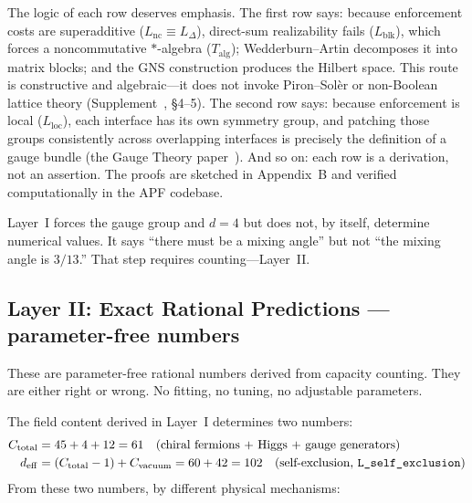 \documentclass[11pt]{article}
\begin{document}
The logic of each row deserves emphasis.  The first row says: because enforcement costs are superadditive ($L_{\mathrm{nc}} \equiv L_\Delta$), direct-sum realizability fails ($L_{\mathrm{blk}}$), which forces a noncommutative $*$-algebra ($T_{\mathrm{alg}}$); Wedderburn--Artin decomposes it into matrix blocks; and the GNS construction produces the Hilbert space.  This route is constructive and algebraic---it does not invoke Piron--Sol\`er or non-Boolean lattice theory (Supplement~\cite{Supp}, §4--5).  The second row says: because enforcement is local ($L_{\mathrm{loc}}$), each interface has its own symmetry group, and patching those groups consistently across overlapping interfaces is precisely the definition of a gauge bundle (the Gauge Theory paper~\cite{PGT}).  And so on: each row is a derivation, not an assertion.  The proofs are sketched in Appendix~B and verified computationally in the APF codebase.

Layer~I forces the gauge group and $d=4$ but does not, by itself, determine numerical values.  It says ``there must be a mixing angle'' but not ``the mixing angle is $3/13$.''  That step requires counting---Layer~II.


\subsection{Layer II: Exact Rational Predictions --- parameter-free numbers}

These are parameter-free rational numbers derived from capacity counting.  They are either right or wrong.  No fitting, no tuning, no adjustable parameters.

The field content derived in Layer~I determines two numbers:
\begin{align}
C_{\mathrm{total}} &= 45 + 4 + 12 = 61 \quad\text{(chiral fermions + Higgs + gauge generators)} \\
d_{\mathrm{eff}} &= (C_{\mathrm{total}} - 1) + C_{\mathrm{vacuum}} = 60 + 42 = 102 \quad\text{(self-exclusion, \texttt{L\_self\_exclusion})}
\end{align}
From these two numbers, by different physical mechanisms:
\end{document}
